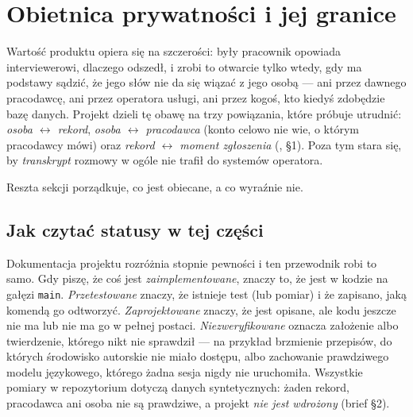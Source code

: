 
\providecommand{\kod}[1]{{\urlstyle{tt}\nolinkurl{#1}}}

\section{Obietnica prywatności i jej granice}
\label{sec:p3-obietnica}

Wartość produktu opiera się na szczerości: były pracownik opowiada
interviewerowi, dlaczego odszedł, i zrobi to otwarcie tylko wtedy, gdy ma
podstawy sądzić, że jego słów nie da się wiązać z jego osobą --- ani przez
dawnego pracodawcę, ani przez operatora usługi, ani przez kogoś, kto kiedyś
zdobędzie bazę danych. Projekt dzieli tę obawę na trzy powiązania, które
próbuje utrudnić: \emph{osoba $\leftrightarrow$ rekord}, \emph{osoba
$\leftrightarrow$ pracodawca} (konto celowo nie wie, o którym pracodawcy
mówi) oraz \emph{rekord $\leftrightarrow$ moment zgłoszenia}
(, §1). Poza tym stara się, by
\emph{transkrypt} rozmowy w ogóle nie trafił do systemów operatora.

 Reszta
sekcji porządkuje, co jest obiecane, a co wyraźnie nie.

\subsection*{Jak czytać statusy w tej części}

Dokumentacja projektu rozróżnia stopnie pewności i ten przewodnik robi to
samo. Gdy piszę, że coś jest \emph{zaimplementowane}, znaczy to, że jest w
kodzie na gałęzi \texttt{main}. \emph{Przetestowane} znaczy, że istnieje test
(lub pomiar) i że zapisano, jaką komendą go odtworzyć. \emph{Zaprojektowane}
znaczy, że jest opisane, ale kodu jeszcze nie ma lub nie ma go w pełnej
postaci. \emph{Niezweryfikowane} oznacza założenie albo twierdzenie, którego
nikt nie sprawdził --- na przykład brzmienie przepisów, do których
środowisko autorskie nie miało dostępu, albo zachowanie prawdziwego modelu
językowego, którego żadna sesja nigdy nie uruchomiła. Wszystkie pomiary w
repozytorium dotyczą danych syntetycznych: żaden rekord, pracodawca ani osoba
nie są prawdziwe, a projekt \emph{nie jest wdrożony} (brief §2).

